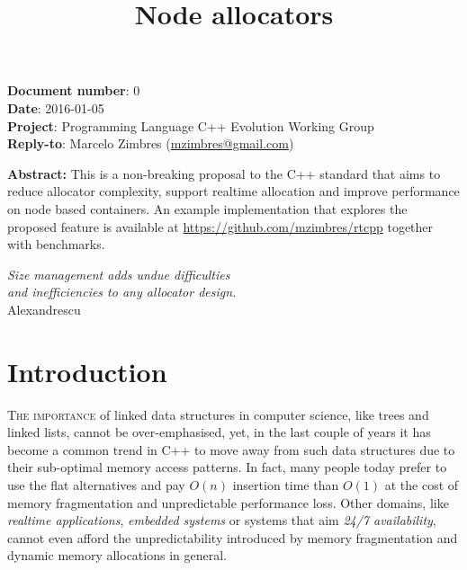 \documentclass[11pt]{article}
\begin{document}
\date{}
\title{\bf Node allocators}

\maketitle\vspace{-2cm}

\vspace{1cm}

\noindent
{\bf Document number}:  0 \\
{\bf Date}:  2016-01-05 \\
{\bf Project}: Programming Language C++ Evolution Working Group \\
{\bf Reply-to}: Marcelo Zimbres (\href{mailto:mzimbres@gmail.com}{mzimbres@gmail.com}) 

\vspace{1cm}

\noindent
{\bf Abstract: }This is a non-breaking proposal to the C++ standard
that aims to reduce allocator complexity, support realtime allocation
and improve performance on node based containers. An example
implementation that explores the proposed feature is available at
\href{https://github.com/mzimbres/rtcpp}{https://github.com/mzimbres/rtcpp}
together with benchmarks.

\tableofcontents

\begin{flushright}
\noindent
{\it Size management adds undue difficulties \\
     and inefficiencies to any allocator design.} \\
Alexandrescu \\
\medskip
{\it }
\end{flushright}
\medskip

\section{Introduction}
\textsc{The importance} of linked data structures in computer science,
like trees and linked lists, cannot be over-emphasised, yet, in the
last couple of years it has become a common trend in C++ to move away
from such data structures due to their sub-optimal memory access
patterns.  In fact, many people today prefer to use the flat
alternatives and pay $O(n)$ insertion time than $O(1)$ at the cost of
memory fragmentation and unpredictable performance loss. Other
domains, like {\it realtime applications}, {\it embedded systems} or
systems that aim {\it 24/7 availability}, cannot even afford the
unpredictability introduced by memory fragmentation and dynamic
memory allocations in general.
\end{document}
